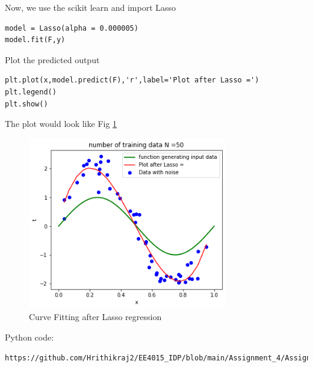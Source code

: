 \documentclass[journal,12pt,twocolumn]{IEEEtran}
\begin{document}
Now, we use the scikit learn and import Lasso
\begin{lstlisting}
model = Lasso(alpha = 0.000005)
model.fit(F,y)
\end{lstlisting}
Plot the predicted output
\begin{lstlisting}
plt.plot(x,model.predict(F),'r',label='Plot after Lasso =')
plt.legend()
plt.show()
\end{lstlisting}
The plot would look like Fig \ref{fig:2}
\begin{figure}[!h]
\begin{center}
\includegraphics[width=3.4in]{figs/fig2.png}
\end{center}
\caption{Curve Fitting after Lasso regression}
\label{fig:2}
\end{figure}

Python code:
\begin{lstlisting}
https://github.com/Hrithikraj2/EE4015_IDP/blob/main/Assignment_4/Assignment_4.ipynb
\end{lstlisting}
\end{document}
